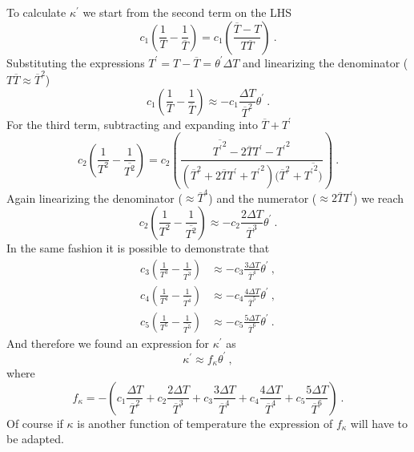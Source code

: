 \documentclass[10pt]{article}
\def\lp{\left(}
\def\rp{\right)}
\def\tr{{\theta^\prime}}
\begin{document}
To calculate $\kappa^\prime$ we start from the second term on the LHS
\begin{equation*}
c_1 \lp \frac{1}{T} - \frac{1}{\overline{T}} \rp = c_1 \lp \frac{\overline{T} - T}{T\overline{T}} \rp \ .
\end{equation*}
Substituting the expressions $T^\prime  = T - \overline{T} = \theta^\prime \Delta T$ and linearizing the denominator ($T\overline{T} \approx \overline{T}^2$)
\begin{equation*}
c_1 \lp \frac{1}{T} - \frac{1}{\overline{T}} \rp \approx - c_1 \frac{\Delta T}{\overline{T}^2} \tr \ .
\end{equation*}
For the third term, subtracting and expanding into $\overline{T}+T^\prime$
\begin{equation*}
c_2 \lp \frac{1}{T^2} - \frac{1}{\overline{T^2}} \rp = c_2 \lp \frac{\overline{{T^\prime}^2} - 2\overline{T}{T^\prime} - {T^\prime}^2}{(\overline{T}^2 + 2\overline{T}T^\prime + {T^\prime}^2)(\overline{T}^2 + \overline{{T^\prime}^2)}} \rp \ .
\end{equation*}
Again linearizing the denominator ($\approx \overline{T}^4$) and the numerator ($\approx 2\overline{T}T^\prime$) we reach
\begin{equation*}
c_2 \lp \frac{1}{T^2} - \frac{1}{\overline{T^2}} \rp \approx - c_2  \frac{2\Delta T}{\overline{T}^3} \tr \ .
\end{equation*}
In the same fashion it is possible to demonstrate that 
\begin{equation*}
\begin{split}
c_3 \lp \frac{1}{T^3} - \frac{1}{\overline{T^3}} \rp & \approx - c_3  \frac{3\Delta T}{\overline{T}^4} \tr \ ,\\
c_4 \lp \frac{1}{T^4} - \frac{1}{\overline{T^4}} \rp & \approx - c_4  \frac{4\Delta T}{\overline{T}^5} \tr \ ,\\
c_5 \lp \frac{1}{T^5} - \frac{1}{\overline{T^5}} \rp & \approx - c_5  \frac{5\Delta T}{\overline{T}^6} \tr \ .
\end{split}
\end{equation*}
And therefore we found an expression for $\kappa^\prime$ as
\begin{equation*}
\kappa^\prime \approx f_{\kappa} \theta^\prime \ ,
\end{equation*}
where
\begin{equation*}
f_{\kappa} =  - \lp c_1  \frac{\Delta T}{\overline{T}^2} + c_2  \frac{2\Delta T}{\overline{T}^3} + c_3  \frac{3\Delta T}{\overline{T}^4} +  c_4  \frac{4\Delta T}{\overline{T}^4} +  c_5  \frac{5\Delta T}{\overline{T}^6} \rp \ .
\end{equation*}
Of course if $\kappa$ is another function of temperature the expression of $f_{\kappa}$ will have to be adapted.
\end{document}

